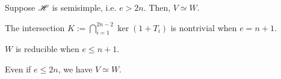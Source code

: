 \documentclass{amsart}
\begin{document}
{\color{olive}
  \begin{proposition}
    Suppose $\mathscr{H}$ is semisimple, i.e. $e > 2n$.
    Then, $V \simeq W$.
  \end{proposition}
}

{\color{red}
\begin{proposition}
  The intersection $K := \bigcap_{i = 1}^{2n - 2} \ker (1 + T_i)$ is nontrivial when $e = n + 1$.
\end{proposition}
\begin{proposition}
  $W$ is reducible when $e \leq n + 1$.
\end{proposition}
\begin{proposition}
  Even if $e \leq 2n$, we have $V \simeq W$.
\end{proposition}
}
\end{document}
